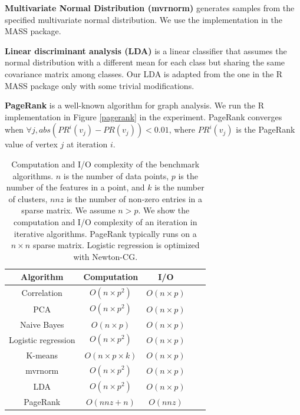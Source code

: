\noindent \textbf{Multivariate Normal Distribution (mvrnorm)} generates
samples from the specified multivariate normal distribution. We use
the implementation in the MASS package.

\noindent \textbf{Linear discriminant analysis (LDA)} is a linear classifier
that assumes the normal distribution with a different mean for each class
but sharing the same covariance matrix among classes. Our LDA is adapted from
the one in the R MASS package only with some trivial modifications.

\noindent \textbf{PageRank} is a well-known algorithm for graph analysis.
We run the R implementation in Figure \ref{pagerank} in the experiment.
PageRank converges when $\forall j, abs(PR^i(v_j) - PR(v_{j})) < 0.01$,
where $PR^i(v_j)$ is the PageRank value of vertex $j$ at iteration $i$.

\begin{table}
\begin{center}
\caption{Computation and I/O complexity of the benchmark algorithms. $n$ is
	the number
	of data points, $p$ is the number of the features in a point, and $k$ is
	the number of clusters, $nnz$ is the number of non-zero entries in
	a sparse matrix. We assume $n > p$. We show the computation and I/O
	complexity of an iteration in iterative algorithms. PageRank typically
	runs on a $n \times n$ sparse matrix. Logistic regression is optimized
	with Newton-CG.
}
\vspace{-10pt}
\footnotesize
\begin{tabular}{|c|c|c|c|c|}
\hline
Algorithm & Computation & I/O \\
\hline
Correlation & $O(n \times p^2)$ & $O(n \times p)$ \\
\hline
PCA & $O(n \times p^2)$ & $O(n \times p)$ \\
\hline
Naive Bayes & $O(n \times p)$ & $O(n \times p)$ \\
\hline
Logistic regression & $O(n \times p^2)$ & $O(n \times p)$ \\
\hline
K-means & $O(n \times p \times k)$ & $O(n \times p)$ \\
\hline
mvrnorm & $O(n \times p^2)$ & $O(n \times p)$ \\
\hline
LDA & $O(n \times p^2)$ & $O(n \times p)$ \\
\hline
PageRank & $O(nnz + n)$ & $O(nnz)$ \\
\hline
\end{tabular}
\normalsize
\label{tbl:algs}
\end{center}
\end{table}

